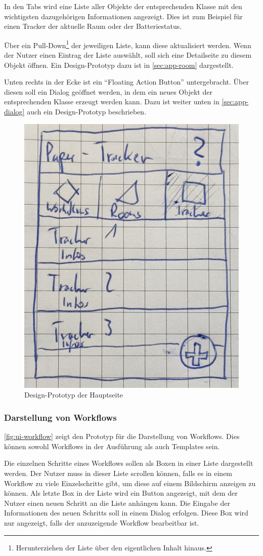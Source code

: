 In den Tabs wird eine Liste aller Objekte der entsprechenden Klasse mit den wichtigsten dazugehörigen Informationen angezeigt.
Dies ist zum Beispiel für einen Tracker der aktuelle Raum oder der Batteriestatus.

Über ein Pull-Down\footnote{Herunterziehen der Liste über den eigentlichen Inhalt hinaus.} der jeweiligen Liste, kann diese aktualisiert werden.
Wenn der Nutzer einen Eintrag der Liste auswählt, soll sich eine Detailseite zu diesem Objekt öffnen.
Ein Design-Prototyp dazu ist in \autoref{sec:app-room} dargestellt.

Unten rechts in der Ecke ist ein \enquote{Floating Action Button} untergebracht.
Über diesen soll ein Dialog geöffnet werden, in dem ein neues Objekt der entsprechenden Klasse erzeugt werden kann.
Dazu ist weiter unten in \autoref{sec:app-dialog} auch ein Design-Prototyp beschrieben.

\begin{figure}[h!tbp]
	\includegraphics[width=.4\textwidth]{images/ui-prototype/main_page.jpg}
	\centering
	\caption{Design-Prototyp der Hauptseite}
	\label{fig:ui-main-page}
\end{figure}

\FloatBarrier

\subsubsection{Darstellung von Workflows}

\autoref{fig:ui-workflow} zeigt den Prototyp für die Darstellung von Workflows.
Dies können sowohl Workflows in der Ausführung als auch Templates sein.

Die einzelnen Schritte eines Workflows sollen als Boxen in einer Liste dargestellt werden.
Der Nutzer muss in dieser Liste scrollen können, falls es in einem Workflow zu viele Einzelschritte
gibt, um diese auf einem Bildschirm anzeigen zu können.
Als letzte Box in der Liste wird ein Button angezeigt, mit dem der Nutzer einen neuen Schritt an die Liste anhängen kann.
Die Eingabe der Informationen des neuen Schritts soll in einem Dialog erfolgen.
Diese Box wird nur angezeigt, falls der anzuzeigende Workflow bearbeitbar ist.

